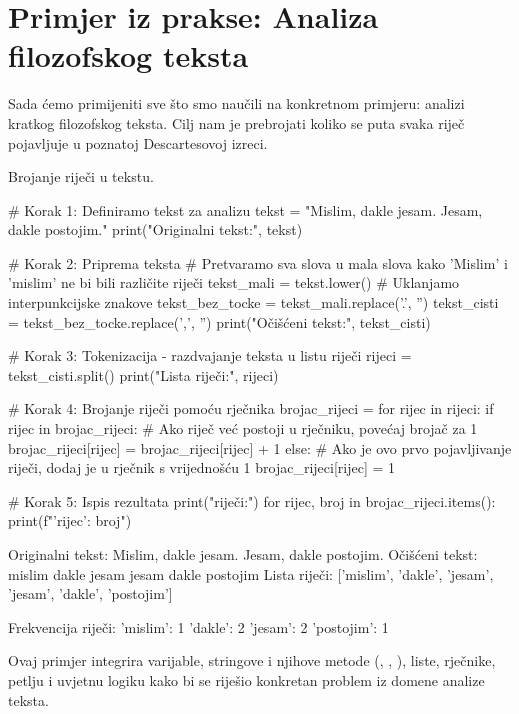 \section{Primjer iz prakse: Analiza filozofskog teksta}
\label{sec:primjer_prakse}

Sada ćemo primijeniti sve što smo naučili na konkretnom primjeru: analizi kratkog filozofskog teksta. Cilj nam je prebrojati koliko se puta svaka riječ pojavljuje u poznatoj Descartesovoj izreci.

\begin{primjerokvir}
    Brojanje riječi u tekstu.
    \begin{pythoncode}
# Korak 1: Definiramo tekst za analizu
tekst = "Mislim, dakle jesam. Jesam, dakle postojim."
print("Originalni tekst:", tekst)

# Korak 2: Priprema teksta
# Pretvaramo sva slova u mala slova kako 'Mislim' i 'mislim' ne bi bili različite riječi
tekst_mali = tekst.lower()
# Uklanjamo interpunkcijske znakove
tekst_bez_tocke = tekst_mali.replace('.', '')
tekst_cisti = tekst_bez_tocke.replace(',', '')
print("Očišćeni tekst:", tekst_cisti)

# Korak 3: Tokenizacija - razdvajanje teksta u listu riječi
rijeci = tekst_cisti.split()
print("Lista riječi:", rijeci)

# Korak 4: Brojanje riječi pomoću rječnika
brojac_rijeci = {}
for rijec in rijeci:
    if rijec in brojac_rijeci:
        # Ako riječ već postoji u rječniku, povećaj brojač za 1
        brojac_rijeci[rijec] = brojac_rijeci[rijec] + 1
    else:
        # Ako je ovo prvo pojavljivanje riječi, dodaj je u rječnik s vrijednošću 1
        brojac_rijeci[rijec] = 1

# Korak 5: Ispis rezultata
print("\nFrekvencija riječi:")
for rijec, broj in brojac_rijeci.items():
    print(f"'{rijec}': {broj}")
    \end{pythoncode}

    \begin{codeoutput}
Originalni tekst: Mislim, dakle jesam. Jesam, dakle postojim.
Očišćeni tekst: mislim dakle jesam jesam dakle postojim
Lista riječi: ['mislim', 'dakle', 'jesam', 'jesam', 'dakle', 'postojim']

Frekvencija riječi:
'mislim': 1
'dakle': 2
'jesam': 2
'postojim': 1
    \end{codeoutput}
    Ovaj primjer integrira varijable, stringove i njihove metode (, , ), liste, rječnike,  petlju i  uvjetnu logiku kako bi se riješio konkretan problem iz domene analize teksta.
\end{primjerokvir}

